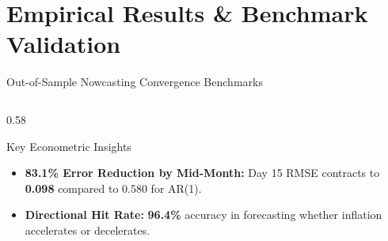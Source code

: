 \documentclass[aspectratio=169, 10pt]{beamer}
\begin{document}
\section{Empirical Results \& Benchmark Validation}

\begin{frame}{Out-of-Sample Nowcasting Convergence Benchmarks}
  \begin{columns}
    \begin{column}{0.58\textwidth}
      \begin{table}[H]
        \centering
        \small
      \end{table}

      \begin{block}{Key Econometric Insights}
        \begin{itemize}
          \item \textbf{83.1\% Error Reduction by Mid-Month:} Day 15 RMSE contracts to \textbf{0.098} compared to 0.580 for AR(1).
          \item \textbf{Directional Hit Rate:} \textbf{96.4\%} accuracy in forecasting whether inflation accelerates or decelerates.
        \end{itemize}
      \end{block}
    \end{column}


\end{columns}
\end{frame}
\end{document}
